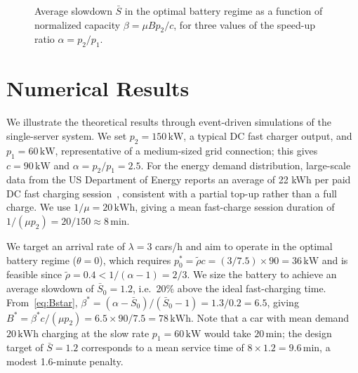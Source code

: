 \documentclass{sig-alternate-per-modified}
\begin{document}
\begin{figure}[t]
\centering
{}
\caption{Average slowdown $\bar{S}$ in the optimal battery regime as a function of normalized capacity $\beta = \mu B p_2/c$, for
three values of the speed-up ratio $\alpha = p_2/p_1$.}
\label{fig:Sbar}
\end{figure}

\section{Numerical Results}
\label{sec:sims}

We illustrate the theoretical results through event-driven simulations of the
single-server system. We set $p_2 = 150\,\unit{\kilo\watt}$, a typical DC fast
charger output, and $p_1 = 60\,\unit{\kilo\watt}$, representative of a medium-sized
grid connection; this gives $c = 90\,\unit{\kilo\watt}$ and $\alpha = p_2/p_1 = 2.5$.
For the energy demand distribution, large-scale data from the US
Department of Energy reports an average of 22 kWh per paid DC fast charging
session~\cite{NREL2023}, consistent with a partial top-up rather than a
full charge. We use $1/\mu = 20\,\unit{\kilo\watt\hour}$, giving a mean fast-charge
session duration of $1/(\mu p_2) = 20/150 \approx 8\,\unit{\minute}$.

We target an arrival rate of $\lambda = 3$ cars/h and aim to operate in the optimal
battery regime ($\theta = 0$), which requires $p_0^* = \tilde\rho c = (3/7.5)\times
90 = 36\,\unit{\kilo\watt}$ and is feasible since $\tilde\rho = 0.4 < 1/(\alpha-1)
= 2/3$. We size the battery to achieve an average slowdown of $\bar{S}_0 = 1.2$,
i.e.\ 20\% above the ideal fast-charging time. From~\eqref{eq:Bstar},
$\beta^* = (\alpha-\bar{S}_0)/(\bar{S}_0-1) = 1.3/0.2 = 6.5$, giving
$B^* = \beta^* c/(\mu p_2) = 6.5 \times 90/7.5 = 78\,\unit{\kilo\watt\hour}$.
Note that a car with mean demand $20\,\unit{\kilo\watt\hour}$ charging
at the slow rate $p_1 = 60\,\unit{\kilo\watt}$ would take $20\,\unit{\minute}$;
the design target of $\bar{S}=1.2$ corresponds to a mean service time of
$8 \times 1.2 = 9.6\,\unit{\minute}$, a modest 1.6-minute penalty. 
\end{document}
